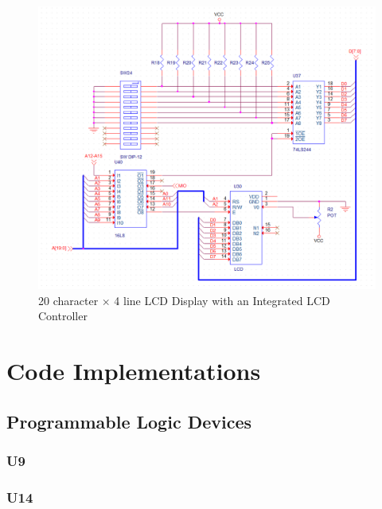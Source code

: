 \begin{appendices}
        \begin{figure}[ht]
            \begin{center}
                \includegraphics[width=1\textwidth]{figures/schematics/lcd.png}
                \caption{20 character $\times$ 4 line LCD Display with an Integrated LCD Controller} \label{fig:page11}
            \end{center}
        \end{figure}


    \clearpage
    \newpage

    \section{Code Implementations} \label{appendix:code}

        \subsection{Programmable Logic Devices}

            \subsubsection{U9}


            \newpage
            \subsubsection{U14}


\end{appendices}
